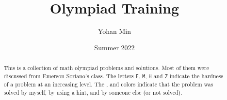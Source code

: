 \documentclass[11pt]{scrartcl}
\title{Olympiad Training}
\author{Yohan Min}
\date{Summer 2022}
\begin{document}
\maketitle

\begin{abstract}
	This is a collection of math olympiad problems and solutions. Most of them were discussed from \href{https://www.facebook.com/emerson.sorianoperez}{Emerson Soriano}'s class. The letters \verb|E|, \verb|M|, \verb|H| and \verb|Z| indicate the hardness of a problem at an increasing level. The ,  and  colors indicate that the problem was solved by myself, by using a hint, and by someone else (or not solved).
\end{abstract}

\tableofcontents






\end{document}
